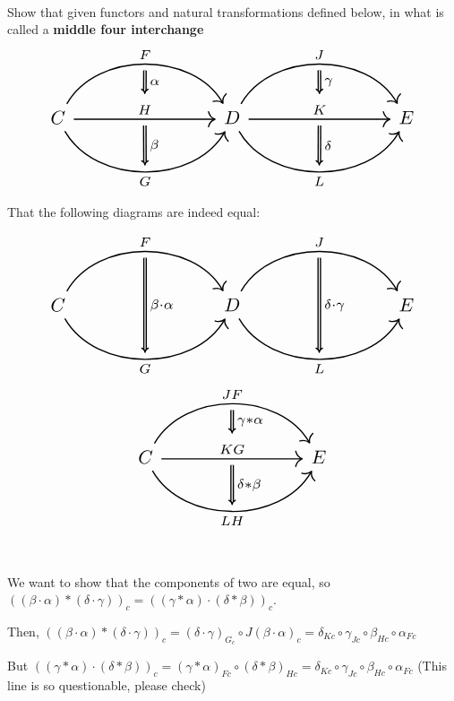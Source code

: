 \documentclass{article}
\begin{document}
\begin{lemma}
\

Show that given functors and natural transformations defined below, in what is called a \textbf{middle four interchange} 
\[
\begin{tikzcd}[
    column sep=4cm, 
    row sep=huge, 
    nodes={scale=1.5}, 
    every arrow/.append style={line width=1pt} 
]
    C & D & E
    \arrow[from=1-1, to=1-2, bend left = 60, "F"{name=F}]
    \arrow[from=1-1, to=1-2, bend right = 60, "G"'{name=G}]
    \arrow[from=1-1, to=1-2, "H"{name=H}]
    \arrow[from=1-2, to=1-3, bend left = 60, "J"{name=J}]
    \arrow[from=1-2, to=1-3, bend right = 60, "L"'{name=L}]
    \arrow[from=1-2, to=1-3, "K"{name=K}]
    \arrow[Rightarrow, from=F, to=H, "\alpha", shorten <= 5pt, shorten >= 5pt]
    \arrow[Rightarrow, from=H, to=G, "\beta", shorten <= 5pt, shorten >= 5pt]
    \arrow[Rightarrow, from=J, to=K, "\gamma", shorten <= 5pt, shorten >= 5pt]
    \arrow[Rightarrow, from=K, to=L, "\delta", shorten <= 5pt, shorten >= 5pt]
\end{tikzcd}
\]

That the following diagrams are indeed equal: 

\[
\begin{tikzcd}[
    column sep=4cm, 
    row sep=huge, 
    nodes={scale=1.5}, 
    every arrow/.append style={line width=1pt} 
]
    C & D & E
    \arrow[from=1-1, to=1-2, bend left = 60, "F"{name=F}]
    \arrow[from=1-1, to=1-2, bend right = 60, "G"'{name=G}]
    \arrow[from=1-2, to=1-3, bend left = 60, "J"{name=J}]
    \arrow[from=1-2, to=1-3, bend right = 60, "L"'{name=L}]
    \arrow[Rightarrow, from=F, to=G, "\beta \cdot \alpha", shorten <= 5pt, shorten >= 5pt]
    \arrow[Rightarrow, from=J, to=L, "\delta \cdot \gamma", shorten <= 5pt, shorten >= 5pt]
\end{tikzcd}
\]
\[
\begin{tikzcd}[
    column sep=4cm, 
    row sep=huge, 
    nodes={scale=1.5}, 
    every arrow/.append style={line width=1pt} 
]
    C & E
    \arrow[from=1-1, to=1-2, "KG"{name=G}]
    \arrow[from=1-1, to=1-2, bend left = 60, "JF"{name=F}]
    \arrow[from=1-1, to=1-2, bend right = 60, "LH"'{name=H}]
    \arrow[Rightarrow, from=F, to=G, "\gamma * \alpha", shorten <= 5pt, shorten >= 5pt]
    \arrow[Rightarrow, from=G, to=H, "\delta * \beta", shorten <= 5pt, shorten >= 5pt]
\end{tikzcd}
\]
\end{lemma}

\begin{customproof}
\

We want to show that the components of two are equal, so $((\beta \cdot \alpha) * (\delta \cdot \gamma))_c = ((\gamma * \alpha) \cdot (\delta * \beta))_c$. 

Then, $((\beta \cdot \alpha) * (\delta \cdot \gamma))_c = (\delta \cdot \gamma)_{G_c} \circ J(\beta \cdot \alpha)_c =  \delta_{Kc} \circ \gamma_{Jc} \circ \beta_{Hc} \circ \alpha_{Fc}$

But $((\gamma * \alpha) \cdot (\delta * \beta))_c =(\gamma * \alpha)_{Fc} \circ (\delta * \beta)_{Hc} = \delta_{Kc}  \circ \gamma_{Jc} \circ \beta_{Hc} \circ \alpha_{Fc}$ (This line is so questionable, please check)
\end{customproof}
\end{document}
